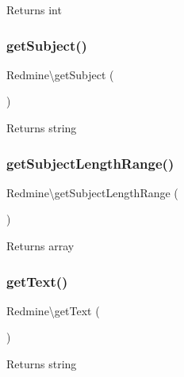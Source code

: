 \begin{DoxyReturn}{Returns}
int 
\end{DoxyReturn}
\mbox{\label{namespace_redmine_ac2b99e9dd9acc77c7afaa9b55c395477}} 
\subsubsection{\texorpdfstring{get\+Subject()}{getSubject()}}
{\footnotesize\ttfamily Redmine\textbackslash{}get\+Subject (\begin{DoxyParamCaption}{ }\end{DoxyParamCaption})}

\begin{DoxyReturn}{Returns}
string 
\end{DoxyReturn}
\mbox{\label{namespace_redmine_a1c2727f393a7ea6c7454e27ba0696c79}} 
\subsubsection{\texorpdfstring{get\+Subject\+Length\+Range()}{getSubjectLengthRange()}}
{\footnotesize\ttfamily Redmine\textbackslash{}get\+Subject\+Length\+Range (\begin{DoxyParamCaption}{ }\end{DoxyParamCaption})}

\begin{DoxyReturn}{Returns}
array 
\end{DoxyReturn}
\mbox{\label{namespace_redmine_a4850ca0eec8345f1ee03cfcc7294896f}} 
\subsubsection{\texorpdfstring{get\+Text()}{getText()}}
{\footnotesize\ttfamily Redmine\textbackslash{}get\+Text (\begin{DoxyParamCaption}{ }\end{DoxyParamCaption})}

\begin{DoxyReturn}{Returns}
string 
\end{DoxyReturn}
\mbox{\label{namespace_redmine_a3e0bcb30f7c170ef7583b717c4357916}} 

